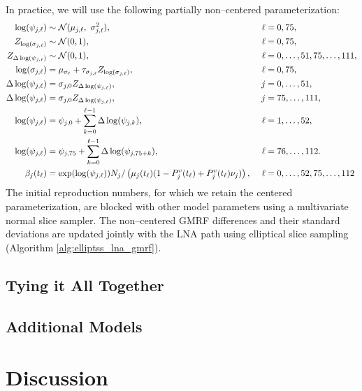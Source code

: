 In practice, we will use the following partially non--centered parameterization:
\begin{align}
\log(\psi_{j,\ell}) &\sim \mcN(\mu_{j,\ell},\ \sigma_{j,\ell}^2),&\ \ell &= 0,75, \nonumber\\
Z_{\log(\sigma_{j,\ell})} &\sim \mcN(0,1),&\ \ell&=0,75, \nonumber \\
Z_{\Delta\log(\psi_{j,\ell})} &\sim \mcN(0,1),&\ \ell&=0,\dots,51,75,\dots,111, \nonumber \\ 
\log(\sigma_{j,\ell}) &= \mu_{\sigma_\ell} + \tau_{\sigma_{j,\ell}}Z_{\log(\sigma_{j,\ell})},&\ \ell &= 0,75,\nonumber\\
\Delta\log(\psi_{j,\ell})&= \sigma_{j,0} Z_{\Delta\log(\psi_{j,\ell})},&\ j&=0,\dots,51, \nonumber\\
\Delta\log(\psi_{j,\ell})&= \sigma_{j,0} Z_{\Delta\log(\psi_{j,\ell})},&\ j&=75,\dots,111, \nonumber\\
\log(\psi_{j,\ell}) &= \psi_{j,0} + \sum_{k=0}^{\ell-1}\Delta\log(\psi_{j,k}),&\ \ell &= 1,\dots,52, \nonumber\\
\log(\psi_{j,\ell}) &= \psi_{j,75} + \sum_{k=0}^{\ell-1}\Delta\log(\psi_{j,75+k}),&\ \ell &= 76,\dots,112. \nonumber\\
\beta_j(t_\ell) &= \exp(\log(\psi_{j,\ell}))N_j/\left (\mu_{j}(t_\ell)(1 - P^v_j(t_\ell) + P_j^v(t_\ell)\nu_j)\right ),&\ \ell&=0,\dots,52,75,\dots,112 \nonumber
\end{align}
The initial reproduction numbers, for which we retain the centered parameterization, are blocked with other model parameters using a multivariate normal slice sampler. The non--centered GMRF differences and their standard deviations are updated jointly with the LNA path using elliptical slice sampling (Algorithm \ref{alg:elliptss_lna_gmrf}). 

\subsection{Tying it All Together}
\label{subsec:flu_model}

\subsection{Additional Models}

\section{Discussion}